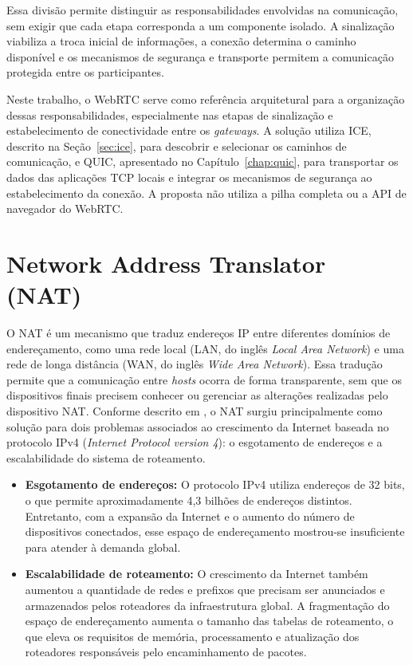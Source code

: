 Essa divisão permite distinguir as responsabilidades envolvidas na comunicação, sem exigir que cada etapa corresponda a um componente isolado. A sinalização viabiliza a troca inicial de informações, a conexão determina o caminho disponível e os mecanismos de segurança e transporte permitem a comunicação protegida entre os participantes.

Neste trabalho, o WebRTC serve como referência arquitetural para a organização dessas responsabilidades, especialmente nas etapas de sinalização e estabelecimento de conectividade entre os \textit{gateways}. A solução utiliza ICE, descrito na Seção~\ref{sec:ice}, para descobrir e selecionar os caminhos de comunicação, e QUIC, apresentado no Capítulo~\ref{chap:quic}, para transportar os dados das aplicações TCP locais e integrar os mecanismos de segurança ao estabelecimento da conexão. A proposta não utiliza a pilha completa ou a API de navegador do WebRTC.

\section{Network Address Translator (NAT)}
\label{sec:network_address_translator}

O NAT é um mecanismo que traduz endereços IP entre diferentes domínios de endereçamento, como uma rede local (LAN, do inglês \textit{Local Area Network}) e uma rede de longa distância (WAN, do inglês \textit{Wide Area Network}). Essa tradução permite que a comunicação entre \textit{hosts} ocorra de forma transparente, sem que os dispositivos finais precisem conhecer ou gerenciar as alterações realizadas pelo dispositivo NAT. Conforme descrito em \citep{RFC1631}, o NAT surgiu principalmente como solução para dois problemas associados ao crescimento da Internet baseada no protocolo IPv4 (\textit{Internet Protocol version 4}): o esgotamento de endereços e a escalabilidade do sistema de roteamento.

\begin{itemize}
\item \textbf{Esgotamento de endereços:} O protocolo IPv4 utiliza endereços de 32 bits, o que permite aproximadamente 4,3 bilhões de endereços distintos. Entretanto, com a expansão da Internet e o aumento do número de dispositivos conectados, esse espaço de endereçamento mostrou-se insuficiente para atender à demanda global.

\item \textbf{Escalabilidade de roteamento:} O crescimento da Internet também aumentou a quantidade de redes e prefixos que precisam ser anunciados e armazenados pelos roteadores da infraestrutura global. A fragmentação do espaço de endereçamento aumenta o tamanho das tabelas de roteamento, o que eleva os requisitos de memória, processamento e atualização dos roteadores responsáveis pelo encaminhamento de pacotes.

\end{itemize}

